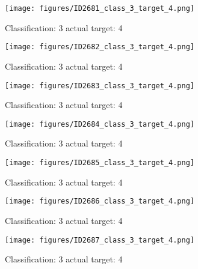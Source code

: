 \begin{figure}[h!]
\begin{center}
\texttt{[image: figures/ID2681\_class\_3\_target\_4.png]}
\end{center}
\caption{ Classification: 3 actual target: 4}
\label{fig:ID2681_class_3_target_4}
\end{figure}
\begin{figure}[h!]
\begin{center}
\texttt{[image: figures/ID2682\_class\_3\_target\_4.png]}
\end{center}
\caption{ Classification: 3 actual target: 4}
\label{fig:ID2682_class_3_target_4}
\end{figure}
\begin{figure}[h!]
\begin{center}
\texttt{[image: figures/ID2683\_class\_3\_target\_4.png]}
\end{center}
\caption{ Classification: 3 actual target: 4}
\label{fig:ID2683_class_3_target_4}
\end{figure}
\begin{figure}[h!]
\begin{center}
\texttt{[image: figures/ID2684\_class\_3\_target\_4.png]}
\end{center}
\caption{ Classification: 3 actual target: 4}
\label{fig:ID2684_class_3_target_4}
\end{figure}
\begin{figure}[h!]
\begin{center}
\texttt{[image: figures/ID2685\_class\_3\_target\_4.png]}
\end{center}
\caption{ Classification: 3 actual target: 4}
\label{fig:ID2685_class_3_target_4}
\end{figure}
\begin{figure}[h!]
\begin{center}
\texttt{[image: figures/ID2686\_class\_3\_target\_4.png]}
\end{center}
\caption{ Classification: 3 actual target: 4}
\label{fig:ID2686_class_3_target_4}
\end{figure}
\begin{figure}[h!]
\begin{center}
\texttt{[image: figures/ID2687\_class\_3\_target\_4.png]}
\end{center}
\caption{ Classification: 3 actual target: 4}
\label{fig:ID2687_class_3_target_4}
\end{figure}

